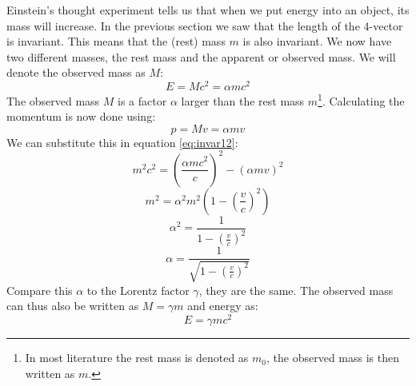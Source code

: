 Einstein's thought experiment tells us that when we put energy into an object, its mass will increase. In the previous section we saw that the length of the 4-vector is invariant. This means that the (rest) mass $m$ is also invariant. We now have two different masses, the rest mass and the apparent or observed mass. We will denote the observed mass as $M$:
\begin{equation}\label{eq:einstein11}
E=Mc^2=\alpha m c^2
\end{equation}
The observed mass $M$ is a factor $\alpha$ larger than the rest mass $m$\footnote{In most literature the rest mass is denoted as $m_0$, the observed mass is then written as $m$.}. Calculating the momentum is now done using:
\begin{equation}\label{eq:einstein12}
p=Mv=\alpha mv
\end{equation}
We can substitute this in equation \ref{eq:invar12}:
\begin{equation}\label{eq:einstein13}
m^2 c^2 =\left( \frac{\alpha m c^2}{c} \right)^2 - (\alpha m v)^2
\end{equation}
\begin{equation}\label{eq:einstein14}
m^2 = \alpha^2 m^2 \left(1-\left(  \frac{v}{c} \right)^2 \right)
\end{equation}
\begin{equation}\label{eq:einstein15}
\alpha^2 = \frac{1}{1-\left( \frac{v}{c} \right)^2 }
\end{equation}
\begin{equation}\label{eq:einstein16}
\alpha = \frac{1}{\sqrt{1-\left( \frac{v}{c} \right)^2}}
\end{equation}
Compare this $\alpha$ to the Lorentz factor $\gamma$, they are the same. The observed mass can thus also be written as $M=\gamma m$ and energy as:
\begin{equation}\label{eq:einstein17}
E=\gamma m c^2
\end{equation}


